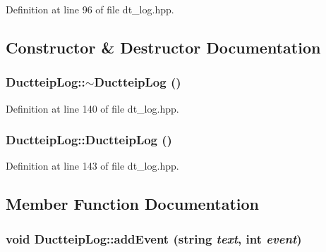


Definition at line 96 of file dt\_\-log.hpp.

\subsection{Constructor \& Destructor Documentation}
\hypertarget{class_ductteip_log_a96b0e451e6c8ea07d1b2aa7b2650da10}{
\subsubsection[{$\sim$DuctteipLog}]{\setlength{\rightskip}{0pt plus 5cm}DuctteipLog::$\sim$DuctteipLog ()}}
\label{class_ductteip_log_a96b0e451e6c8ea07d1b2aa7b2650da10}


Definition at line 140 of file dt\_\-log.hpp.\hypertarget{class_ductteip_log_a55c3b05ea27df799f28f4ecb14be5e17}{
\subsubsection[{DuctteipLog}]{\setlength{\rightskip}{0pt plus 5cm}DuctteipLog::DuctteipLog ()}}
\label{class_ductteip_log_a55c3b05ea27df799f28f4ecb14be5e17}


Definition at line 143 of file dt\_\-log.hpp.

\subsection{Member Function Documentation}
\hypertarget{class_ductteip_log_adfbc05d93e6d90fc9a2f5a4e74578095}{
\subsubsection[{addEvent}]{\setlength{\rightskip}{0pt plus 5cm}void DuctteipLog::addEvent (string {\em text}, \/  int {\em event})}}
\label{class_ductteip_log_adfbc05d93e6d90fc9a2f5a4e74578095}



